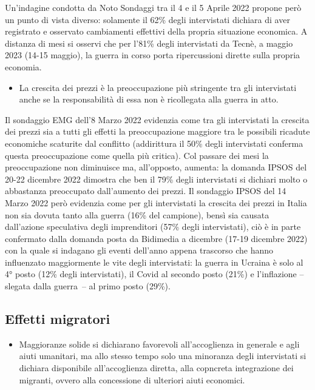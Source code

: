 \documentclass[
]{book}
\providecommand{\tightlist}{%
  \setlength{\itemsep}{0pt}\setlength{\parskip}{0pt}}
\begin{document}
Un'indagine condotta da Noto Sondaggi tra il 4 e il 5 Aprile 2022 propone però un punto di vista diverso: solamente il 62\% degli intervistati dichiara di aver registrato e osservato cambiamenti effettivi della propria situazione economica. A distanza di mesi si osservi che per l'81\% degli intervistati da Tecnè, a maggio 2023 (14-15 maggio), la guerra in corso porta ripercussioni dirette sulla propria economia.

\begin{itemize}
\tightlist
\item
  La crescita dei prezzi è la preoccupazione più stringente tra gli intervistati anche se la responsabilità di essa non è ricollegata alla guerra in atto.
\end{itemize}

Il sondaggio EMG dell'8 Marzo 2022 evidenzia come tra gli intervistati la crescita dei prezzi sia a tutti gli effetti la preoccupazione maggiore tra le possibili ricadute economiche scaturite dal conflitto (addirittura il 50\% degli intervistati conferma questa preoccupazione come quella più critica). Col passare dei mesi la preoccupazione non diminuisce ma, all'opposto, aumenta: la domanda IPSOS del 20-22 dicembre 2022 dimostra che ben il 79\% degli intervistati si dichiari molto o abbastanza preoccupato dall'aumento dei prezzi. Il sondaggio IPSOS del 14 Marzo 2022 però evidenzia come per gli intervistati la crescita dei prezzi in Italia non sia dovuta tanto alla guerra (16\% del campione), bensì sia causata dall'azione speculativa degli imprenditori (57\% degli intervistati), ciò è in parte confermato dalla domanda posta da Bidimedia a dicembre (17-19 dicembre 2022) con la quale si indagano gli eventi dell'anno appena trascorso che hanno influenzato maggiormente le vite degli intervistati: la guerra in Ucraina è solo al 4° posto (12\% degli intervistati), il Covid al secondo posto (21\%) e l'inflazione -- slegata dalla guerra~-- al primo posto (29\%).

\hypertarget{effetti-migratori}{%
\subsection{Effetti migratori}\label{effetti-migratori}}

\begin{itemize}
\tightlist
\item
  Maggioranze solide si dichiarano favorevoli all'accoglienza in generale e agli aiuti umanitari, ma allo stesso tempo solo una minoranza degli intervistati si dichiara disponibile all'accoglienza diretta, alla copncreta integrazione dei migranti, ovvero alla concessione di ulteriori aiuti economici.
\end{itemize}
\end{document}

